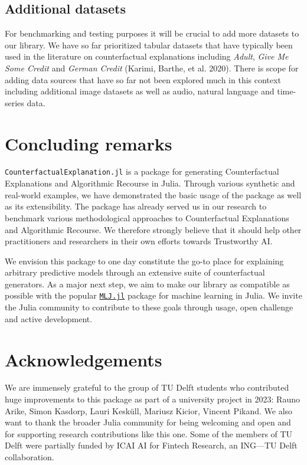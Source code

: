 \documentclass{juliacon}
\begin{document}
\hypertarget{additional-datasets}{%
\subsection{Additional datasets}\label{additional-datasets}}

For benchmarking and testing purposes it will be crucial to add more
datasets to our library. We have so far prioritized tabular datasets
that have typically been used in the literature on counterfactual
explanations including \emph{Adult}, \emph{Give Me Some Credit} and
\emph{German Credit} (Karimi, Barthe, et al. 2020). There is scope for
adding data sources that have so far not been explored much in this
context including additional image datasets as well as audio, natural
language and time-series data.

\hypertarget{sec-conclude}{%
\section{Concluding remarks}\label{sec-conclude}}

\texttt{CounterfactualExplanation.jl} is a package for generating
Counterfactual Explanations and Algorithmic Recourse in Julia. Through
various synthetic and real-world examples, we have demonstrated the
basic usage of the package as well as its extensibility. The package has
already served us in our research to benchmark various methodological
approaches to Counterfactual Explanations and Algorithmic Recourse. We
therefore strongly believe that it should help other practitioners and
researchers in their own efforts towards Trustworthy AI.

We envision this package to one day constitute the go-to place for
explaining arbitrary predictive models through an extensive suite of
counterfactual generators. As a major next step, we aim to make our
library as compatible as possible with the popular
\href{https://alan-turing-institute.github.io/MLJ.jl/dev/}{\texttt{MLJ.jl}}
package for machine learning in Julia. We invite the Julia community to
contribute to these goals through usage, open challenge and active
development.

\hypertarget{sec-ack}{%
\section{Acknowledgements}\label{sec-ack}}

We are immensely grateful to the group of TU Delft students who
contributed huge improvements to this package as part of a university
project in 2023: Rauno Arike, Simon Kasdorp, Lauri Kesküll, Mariusz
Kicior, Vincent Pikand. We also want to thank the broader Julia
community for being welcoming and open and for supporting research
contributions like this one. Some of the members of TU Delft were
partially funded by ICAI AI for Fintech Research, an ING---TU Delft
collaboration.
\end{document}

